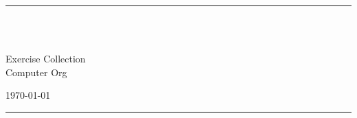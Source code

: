 \fancyhead[C]{}
\hrule \medskip
\begin{minipage}{0.295\textwidth} 
\raggedright
\footnotesize
\yourname \hfill\\ 
\yournetid \hfill\\ 
\youremail
\end{minipage}
\begin{minipage}{0.4\textwidth} 
\centering 
\large 
Exercise Collection \assignmentnumber\\ 
\normalsize 
Computer Org\\ 
\end{minipage}
\begin{minipage}{0.295\textwidth} 
\raggedleft
\today\hfill\\
\end{minipage}
\medskip\hrule 
\bigskip
